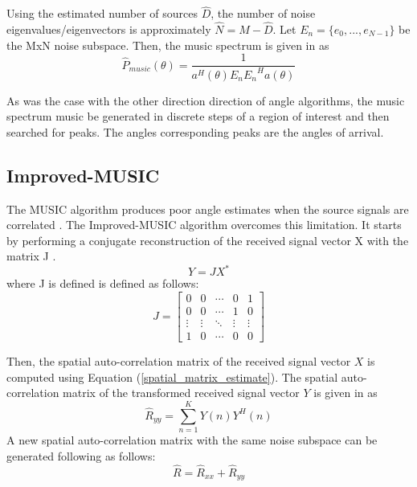 \documentclass[conference]{IEEEtran}
\begin{document}
		Using the estimated number of sources $\hat{D}$, the number of noise eigenvalues/eigenvectors is approximately $\hat{N} = M - \hat{D}$. Let $E_n = \{e_0,...,e_{N-1}\}$ be the MxN noise subspace. Then, the music spectrum is given in \cite{doa_algorithms_raghu} as
	\begin{equation}
		\label{music_spectrum}
		\hat{P}_{music}(\theta) = \frac{1}{a^H(\theta)E_n{E_n}^Ha(\theta)}
	\end{equation}
	
		As was the case with the other direction direction of angle algorithms, the music spectrum music be generated in discrete steps of a region of interest and then searched for peaks. The angles corresponding peaks are the angles of arrival.
		
	\subsection{Improved-MUSIC}
	
		The MUSIC algorithm produces poor angle estimates when the source signals are correlated \cite{doa_algorithms_raghu}. The Improved-MUSIC algorithm overcomes this limitation. It starts by performing a conjugate reconstruction of the received signal vector X with the matrix J \cite{doa_algorithms_raghu}.
		\begin{equation}
			Y = JX^{*}
		\end{equation}
		where J is defined is defined as follows:
		\begin{equation}
			J = \begin{bmatrix}
				0 & 0 & \cdots & 0 & 1\\
				0 & 0 & \cdots & 1 & 0\\
				\vdots & \vdots & \ddots & \vdots & \vdots\\
				1 & 0 & \cdots & 0 & 0
			\end{bmatrix}
		\end{equation}
		
		Then, the spatial auto-correlation matrix of the received signal vector $X$ is computed using Equation (\ref{spatial_matrix_estimate}). The spatial auto-correlation matrix of the transformed received signal vector $Y$ is given in \cite{doa_algorithms_raghu} as
		\begin{equation}
			\hat{R}_{yy} = \sum_{n=1}^{K}{Y(n)Y^H(n)}
		\end{equation}
		A new spatial auto-correlation matrix with the same noise subspace can be generated following \cite{doa_algorithms_raghu} as follows:
		\begin{equation}
			\hat{R} = \hat{R}_{xx} + \hat{R}_{yy}
		\end{equation} 
		
\end{document}
